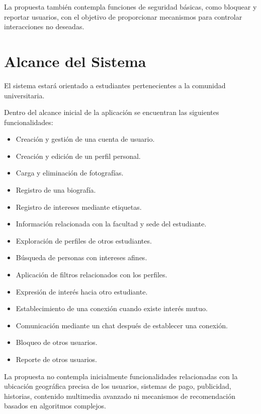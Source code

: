 \documentclass[11pt,a4paper]{article}
\begin{document}
La propuesta también contempla funciones de seguridad básicas, como bloquear y
reportar usuarios, con el objetivo de proporcionar mecanismos para controlar
interacciones no deseadas.


\section{Alcance del Sistema}

El sistema estará orientado a estudiantes pertenecientes a la comunidad
universitaria.

Dentro del alcance inicial de la aplicación se encuentran las siguientes
funcionalidades:

\begin{itemize}
    \item Creación y gestión de una cuenta de usuario.
    \item Creación y edición de un perfil personal.
    \item Carga y eliminación de fotografías.
    \item Registro de una biografía.
    \item Registro de intereses mediante etiquetas.
    \item Información relacionada con la facultad y sede del estudiante.
    \item Exploración de perfiles de otros estudiantes.
    \item Búsqueda de personas con intereses afines.
    \item Aplicación de filtros relacionados con los perfiles.
    \item Expresión de interés hacia otro estudiante.
    \item Establecimiento de una conexión cuando existe interés mutuo.
    \item Comunicación mediante un chat después de establecer una conexión.
    \item Bloqueo de otros usuarios.
    \item Reporte de otros usuarios.
\end{itemize}

La propuesta no contempla inicialmente funcionalidades relacionadas con la
ubicación geográfica precisa de los usuarios, sistemas de pago, publicidad,
historias, contenido multimedia avanzado ni mecanismos de recomendación basados
en algoritmos complejos.
\end{document}
